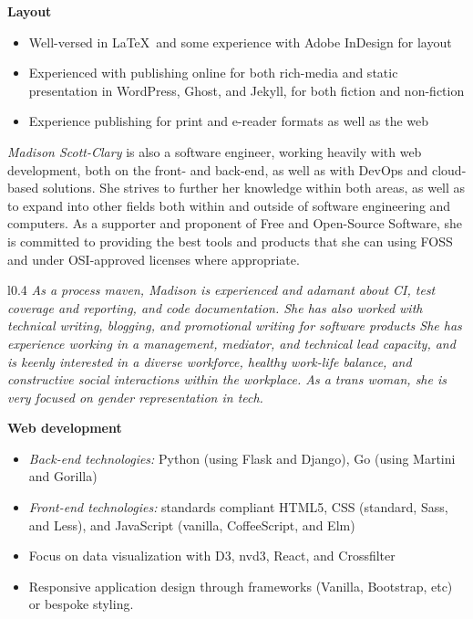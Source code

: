 \documentclass[letterpaper]{memoir}
\begin{document}
\hspace{-1.5em}\textbf{Layout}

\begin{itemize}
  \item Well-versed in \LaTeX\ and some experience with Adobe InDesign for layout
  \item Experienced with publishing online for both rich-media and static presentation in WordPress, Ghost, and Jekyll, for both fiction and non-fiction
  \item Experience publishing for print and e-reader formats as well as the web
\end{itemize}

\newpage

\textit{\large Madison Scott-Clary} is also a software engineer, working heavily with web development, both on the front- and back-end, as well as with DevOps and cloud-based solutions. She strives to further her knowledge within both areas, as well as to expand into other fields both within and outside of software engineering and computers. As a supporter and proponent of Free and Open-Source Software, she is committed to providing the best tools and products that she can using FOSS and under OSI-approved licenses where appropriate.

\begin{wrapfigure}{l}{0.4\linewidth}
  \textit{\color{titlegreydark} \large As a process maven, Madison is experienced and adamant about CI, test coverage and reporting, and code documentation. She has also worked with technical writing, blogging, and promotional writing for software products She has experience working in a management, mediator, and technical lead capacity, and is keenly interested in a diverse workforce, healthy work-life balance, and constructive social interactions within the workplace. As a trans woman, she is very focused on gender representation in tech.}
  \vspace{-0.7in}
\end{wrapfigure}

\textbf{Web development}

\begin{itemize}
  \item \textit{Back-end technologies:} Python (using Flask and Django), Go (using Martini and Gorilla)
  \item \textit{Front-end technologies:} standards compliant HTML5, CSS (standard, Sass, and Less), and JavaScript (vanilla, CoffeeScript, and Elm)
  \item Focus on data visualization with D3, nvd3, React, and Crossfilter
  \item Responsive application design through frameworks (Vanilla, Bootstrap, etc) or bespoke styling.
\end{itemize}
\end{document}
